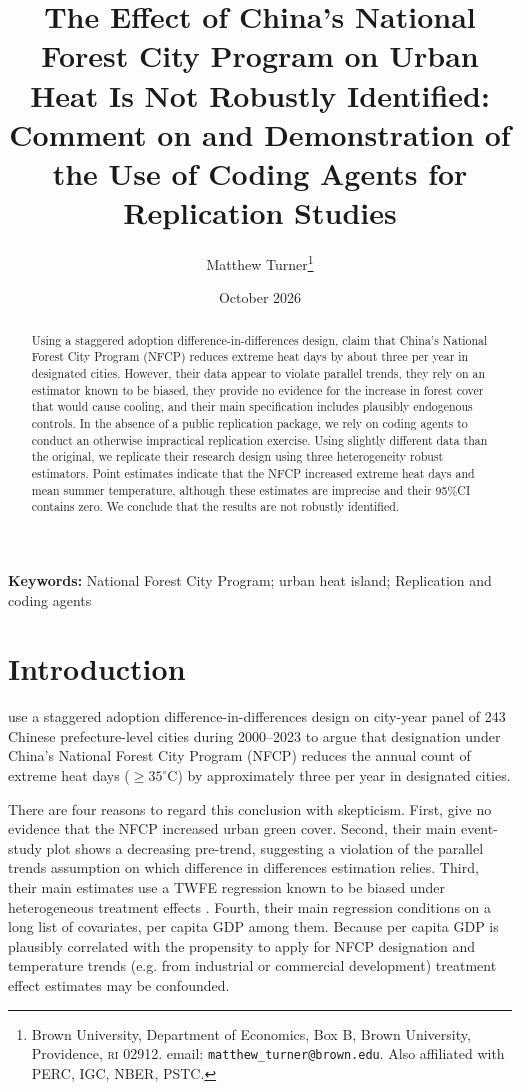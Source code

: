 \documentclass[12pt]{article}
\title{The Effect of China's National Forest City Program on Urban Heat
       Is Not Robustly Identified: Comment on \citet{Ma2026} and Demonstration of the Use of Coding Agents for Replication Studies}
\author{Matthew Turner\footnote{Brown University, Department of Economics, Box B, Brown University, Providence, \textsc{ri} 02912. email: \texttt{matthew\_turner@brown.edu}. Also affiliated with PERC, IGC, NBER, PSTC.}}
\date{October 2026}
\begin{document}
\maketitle

\begin{singlespace}
\begin{abstract}
Using a staggered adoption difference-in-differences design,
\cite{Ma2026} claim that China's National Forest City Program (NFCP) reduces extreme heat days by about three per year in designated cities. However, their data appear to violate parallel trends, they rely on an estimator known to be biased, they provide no evidence for the increase in forest cover that would cause cooling, and their main specification includes plausibly endogenous controls. In the absence of a public replication package, we rely on coding agents to conduct an otherwise impractical replication exercise. Using slightly different data than the original, we replicate their research design using three heterogeneity robust estimators. Point estimates indicate that the NFCP increased extreme heat days and mean summer temperature, although these estimates are imprecise and their 95\%CI contains zero. We conclude that the \citeauthor{Ma2026} results are not robustly identified.
\end{abstract}
\end{singlespace}

\textbf{Keywords:} National Forest City Program; urban heat island;
Replication and coding agents

\section{Introduction}
\label{sec:intro}

\citet{Ma2026} use a staggered adoption difference-in-differences design on city-year panel of 243 Chinese prefecture-level cities during 2000--2023 to argue that designation under China's National Forest City Program (NFCP) reduces the annual count of extreme heat days ($\geq 35^\circ$C) by approximately three per year in designated cities.

There are four reasons to regard this conclusion with skepticism.  First, \citeauthor{Ma2026} give no evidence that the NFCP increased urban green cover. Second, their main event-study plot shows a decreasing pre-trend, suggesting a violation of the parallel trends assumption on which difference in differences estimation relies. Third, their main estimates use a TWFE regression known to be biased under heterogeneous treatment effects \citep{GoodmanBacon2021}. Fourth, their main regression conditions on a long list of covariates, per capita GDP among them. Because per capita GDP is plausibly correlated with the propensity to apply for NFCP designation and temperature trends (e.g. from industrial or commercial development) treatment effect estimates may be confounded.
\end{document}
